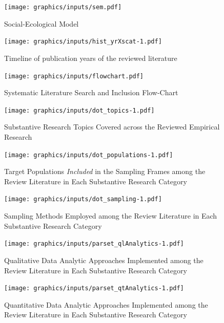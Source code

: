\documentclass[11pt,]{tufte-book}
\begin{document}
\begin{figure}
\centering
\texttt{[image: graphics/inputs/sem.pdf]}
\caption{Social-Ecological Model\label{fig:sem}}
\end{figure}

\newpage

\begin{figure}
\centering
\texttt{[image: graphics/inputs/hist\_yrXscat-1.pdf]}
\caption{Timeline of publication years of the reviewed
literature\label{fig:yrhist}}
\end{figure}

\newpage

\begin{figure}
\centering
\texttt{[image: graphics/inputs/flowchart.pdf]}
\caption{Systematic Literature Search and Inclusion
Flow-Chart\label{fig:flowchart}}
\end{figure}

\newpage

\begin{figure}
\centering
\texttt{[image: graphics/inputs/dot\_topics-1.pdf]}
\caption{Substantive Research Topics Covered across the Reviewed
Empirical Research\label{fig:topics}}
\end{figure}

\newpage

\begin{figure}
\centering
\texttt{[image: graphics/inputs/dot\_populations-1.pdf]}
\caption{Target Populations \emph{Included} in the Sampling Frames among
the Review Literature in Each Substantive Research
Category\label{fig:populations}}
\end{figure}

\newpage

\begin{figure}
\centering
\texttt{[image: graphics/inputs/dot\_sampling-1.pdf]}
\caption{Sampling Methods Employed among the Review Literature in Each
Substantive Research Category\label{fig:sampling}}
\end{figure}

\newpage

\begin{figure}
\centering
\texttt{[image: graphics/inputs/parset\_qlAnalytics-1.pdf]}
\caption{Qualitative Data Analytic Approaches Implemented among the
Review Literature in Each Substantive Research Category\label{fig:aql}}
\end{figure}

\newpage

\begin{figure}
\centering
\texttt{[image: graphics/inputs/parset\_qtAnalytics-1.pdf]}
\caption{Quantitative Data Analytic Approaches Implemented among the
Review Literature in Each Substantive Research Category\label{fig:aqt}}
\end{figure}
\end{document}
